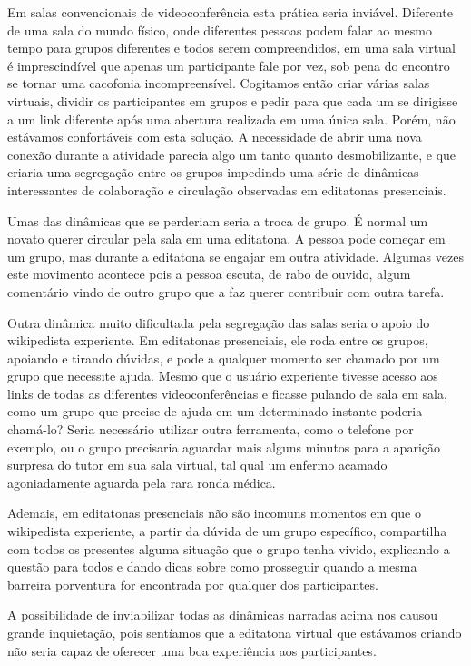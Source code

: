 Em salas convencionais de videoconferência esta prática seria inviável. Diferente de uma sala do mundo físico, onde diferentes pessoas podem falar ao mesmo tempo para grupos diferentes e todos serem compreendidos, em uma sala virtual é imprescindível que apenas um participante fale por vez, sob pena do encontro se tornar uma cacofonia incompreensível.
Cogitamos então criar várias salas virtuais, dividir os participantes em grupos e pedir para que cada um se dirigisse a um link diferente após uma abertura realizada em uma única sala. Porém, não estávamos confortáveis com esta solução. A necessidade de abrir uma nova conexão durante a atividade parecia algo um tanto quanto desmobilizante, e que criaria uma segregação entre os grupos impedindo uma série de dinâmicas interessantes de colaboração e circulação observadas em editatonas presenciais.

Umas das dinâmicas que se perderiam seria a troca de grupo. É normal um novato querer circular pela sala em uma editatona. A pessoa pode começar em um grupo, mas durante a editatona se engajar em outra atividade. Algumas vezes este movimento acontece pois a pessoa escuta, de rabo de ouvido, algum comentário vindo de outro grupo que a faz querer contribuir com outra tarefa.

Outra dinâmica muito dificultada pela segregação das salas seria o apoio do wikipedista experiente. Em editatonas presenciais, ele roda entre os grupos, apoiando e tirando dúvidas, e pode a qualquer momento ser chamado por um grupo que necessite ajuda. Mesmo que o usuário experiente tivesse acesso aos links de todas as diferentes videoconferências e ficasse pulando de sala em sala, como um grupo que precise de ajuda em um determinado instante poderia chamá-lo? Seria necessário utilizar outra ferramenta, como o telefone por exemplo, ou o grupo precisaria aguardar mais alguns minutos para a aparição surpresa do tutor em sua sala virtual, tal qual um enfermo acamado agoniadamente aguarda pela rara ronda médica.

Ademais, em editatonas presenciais não são incomuns momentos em que o wikipedista experiente, a partir da dúvida de um grupo específico, compartilha com todos os presentes alguma situação que o grupo tenha vivido, explicando a questão para todos e dando dicas sobre como prosseguir quando a mesma barreira porventura for encontrada por qualquer dos participantes.

A possibilidade de inviabilizar todas as dinâmicas narradas acima nos causou grande inquietação, pois sentíamos que a editatona virtual que estávamos criando não seria capaz de oferecer uma boa experiência aos participantes.

